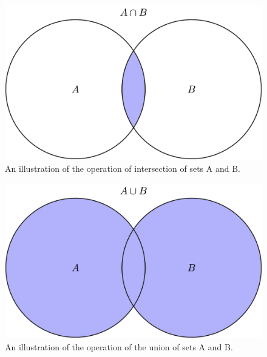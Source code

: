 \documentclass[
  letterpaper,
  DIV=11,
  numbers=noendperiod]{scrreprt}
\begin{document}
\begin{figure}

{\centering \includegraphics{./ch4/set_intersection.png}

}

\caption{An illustration of the operation of intersection of sets A and
B.}

\end{figure}

\begin{figure}

{\centering \includegraphics{./ch4/set_union.png}

}

\caption{An illustration of the operation of the union of sets A and B.}

\end{figure}
\end{document}
